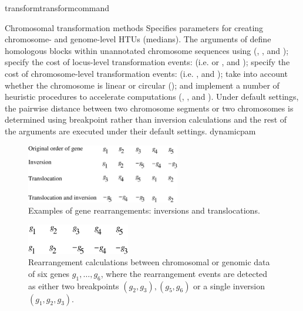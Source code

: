 \begin{command}{transform}{transformcommand}
\begin{arguments}
\begin{argumentgroup}{Chromosomal transformation methods}
            {Specifies parameters for creating chro\-mosome- and genome-level HTUs (medians).
            The arguments of  define homologous blocks within unannotated chromosome sequences using
            (, , and ); specify the cost
            of locus-level transformation events: (i.e.  or ,
            and );  specify the cost of chromosome-level transformation events: 
            (i.e. , and ); 
            take into account whether the chromosome is linear or circular (); and implement a number of heuristic
            procedures to accelerate computations (, , and ).
            Under default settings, the pairwise distance between two chromosome segments or two chromosomes is determined 
            using breakpoint rather than inversion calculations and the rest of the arguments are executed under their default settings.}
            {dynamicpam}

		 \begin{figure} [!htbp]
   		 \begin{center}
        		\includegraphics[width=0.6\textwidth]{doc/figures/genomeRearrangement.pdf}
    		\end{center}
    		 \caption{Examples of gene rearrangements: inversions and translocations.}
		 \label{fig:genomeRearrangement}
		\end{figure}

		\begin{figure}[!htbp]
		\begin{center}
        		\includegraphics[width=0.4\textwidth]{doc/figures/breakpointDis.pdf}
      		\end{center}
		  \caption{Rearrangement calculations between chromosomal or genomic data of six genes $g_1, \ldots, g_6$,
                 	 where the rearrangement events are detected as either two breakpoints $(g_2, g_3), (g_5, g_6)$
                   or a single inversion $(g_1, g_2, g_3)$.}
                   \label{fig:distance}
		\end{figure}
		

\end{argumentgroup}
\end{arguments}
\end{command}

